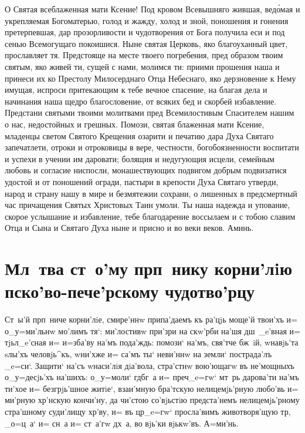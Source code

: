 \documentclass[12pt,twoside,xdvi,a6paper,civil=times]{hipbook}
\renewcommand{\*}{\raise3pt\hbox{\footnotesize*}}
\begin{document}
О Святая всеблаженная мати Ксение! Под кровом Всевышняго жившая, вед\'омая и
укрепляемая Богоматерью, голод и жажду, холод и зной, поношения и гонения
претерпевшая, дар прозорливости и чудотворения от Бога получила еси и под
сенью Всемогущаго покоишися. Ныне святая Церковь, яко благоуханный цвет,
прославляет тя. Предстояще на месте твоего погребения, пред образом твоим
святым, яко живей ти, сущей с нами, молимся ти: приими прошения наша и принеси
их ко Престолу Милосерднаго Отца Небеснаго, яко дерзновение к Нему имущая,
испроси притекающим к тебе вечное спасение, на благая дела и начинания наша
щедро благословение, от всяких бед и скорбей избавление. Предстани святыми
твоими молитвами пред Всемилостивым Спасителем нашим о нас, недостойных и
грешных. Помози, святая блаженная мати Ксение, младенцы светом Святого
Крещения озарити и печатию дара Духа Святаго запечатлети, отроки и отроковицы
в вере, честности, богобоязненности воспитати и успехи в учении им даровати;
болящия и недугующия исцели, семейным любовь и согласие ниспосли,
монашествующих подвигом добрым подвизатися удостой и от поношений огради,
пастыри в крепости Духа Святаго утверди, народ и страну нашу в мире и
безмятежии сохрани, о лишенных в предсмертный час причащения Святых Христовых
Таин умоли. Ты наша надежда и упование, скорое услышание и избавление, тебе
благодарение воссылаем и с тобою славим Отца и Сына и Святаго Духа ныне и
присно и во веки веков. Аминь.

\cs
\raggedbottom
\section[\cs Мл~тва ст~. прп\дмч. корни'лiю]
{Мл~тва ст~о'му прп~нику корни'лiю пско'во-пече'рскому чудотво'рцу}

Ст~ы'й прп~ниче корни'лiе, смире'ннw припа'даемъ къ ра'цjь моще'й
твои'хъ и= о_у=\-ми'ль\-нw мо'лимъ тя`: ми'лостивw при'зри на скw'рби на'шя
дш~_e'вная и= тjьл_e'сная и= и=зба'ву на'мъ пода'ждь: помози` на'мъ, свя'т\-че
бж~iй, w\т навjь'та sлы'хъ че\-ло\-вjь^къ, w\т ни'хже и= са'мъ ты` неви'ннw на
земли` пострада'лъ _e=си`. Защити` на'съ w\т наси'лiя дiа'вола, стра'стнw
вою'ющагw въ не'мощныхъ о_у=десjь'хъ на'шихъ: о_у=моли` гд бг~а и=
преч _e=гw` мт~рь да\-ро\-ва'ти на'мъ ти'хое и= безгрjь'шное житiе`,
вза\-и'м\-ную бра'тскую нелицемjь'рную любо'вь и= ми'рную хр'нскую кончи'ну,
да чи'стою со'\-вjь\-стiю предста'немъ нелицемjь'рному стра'ш\-ному суди'лищу
хр'ву, и= въ цр _e=гw` просла'вимъ животворя'щую тр, _о=ц~а` и=
сн~а и= ст~а'гw дх~а, во вjь'ки вjькw'въ. А=ми'нь.
\end{document}
